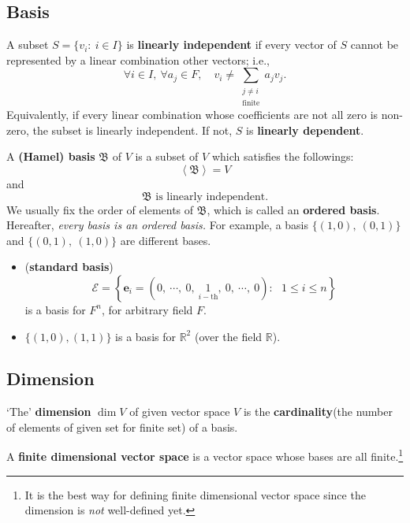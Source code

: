 \subsection{Basis}

\begin{defn} A subset $S = \{v_i:~i\in I\}$ is \textbf{linearly independent} if every vector of $S$ cannot be represented by a linear combination other vectors; i.e., $$\forall i\in I,~\forall a_j\in F,\quad v_i \ne \sum_{\substack{j\ne i \\ \textrm{finite}}} a_j v_j.$$ Equivalently, if every linear combination whose coefficients are not all zero is non-zero, the subset is linearly independent. If not, $S$ is \textbf{linearly dependent}.
\end{defn}

\begin{defn} A \textbf{(Hamel) basis} $\mathfrak B$ of $V$ is a subset of $V$ which satisfies the followings: $$\left<\mathfrak B \right>=V$$ and $$\mathfrak B\textrm{ is linearly independent.}$$
We usually fix the order of elements of $\mathfrak B$, which is called an \textbf{ordered basis}. Hereafter, \textit{every basis is an ordered basis.} For example, a basis $\{(1,0),~(0,1)\}$ and $\{(0,1),~(1,0)\}$ are different bases.
\end{defn}

\begin{ex}\leavevmode
\begin{itemize}
\item (\textbf{standard basis}) $$\mathcal E = \left\{ \mathbf e_i = \left(0,~\cdots,~0,~\underset {i-\textrm{th}} 1,~0,~\cdots,~0\right): ~~~ 1\le i \le n \right\}$$ is a basis for $F^n$, for arbitrary field $F$.
\item $\{ (1,0), (1,1)\}$ is a basis for $\mathbb R^2$ (over the field $\mathbb R$).
\end{itemize}
\end{ex}

\subsection{Dimension}
\begin{defn} `The' \textbf{dimension} $\operatorname{dim} V$ of given vector space $V$ is the \textbf{cardinality}(the number of elements of given set for finite set) of a basis.
\end{defn}

\begin{defn} A \textbf{finite dimensional vector space} is a vector space whose bases are all finite.\footnote[2]{It is the best way for defining finite dimensional vector space since the dimension is \textit{not} well-defined yet.}
\end{defn}


